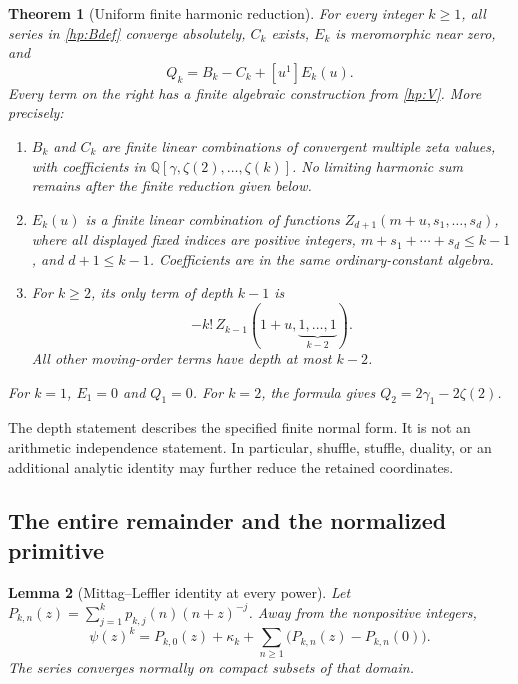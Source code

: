 \documentclass[11pt]{article}
\numberwithin{equation}{section}
\theoremstyle{plain}
\newtheorem{theorem}{Theorem}[section]
\newtheorem{lemma}[theorem]{Lemma}
\theoremstyle{definition}
\theoremstyle{remark}
\newcommand{\Q}{\mathbb Q}
\begin{document}
\begin{theorem}[Uniform finite harmonic reduction]\label{hp:allpowers}
For every integer $k\ge1$, all series in \eqref{hp:Bdef} converge
absolutely, $C_k$ exists, $E_k$ is meromorphic near zero, and
\begin{equation}\label{hp:universal}
 \boxed{\displaystyle Q_k=B_k-C_k+[u^1]E_k(u).}
\end{equation}
Every term on the right has a finite algebraic construction from
\eqref{hp:V}. More precisely:
\begin{enumerate}
 \item $B_k$ and $C_k$ are finite linear combinations of convergent
 multiple zeta values, with coefficients in
 $\Q[\gamma,\zeta(2),\ldots,\zeta(k)]$. No limiting harmonic sum
 remains after the finite reduction given below.
 \item $E_k(u)$ is a finite linear combination of functions
 $Z_{d+1}(m+u,s_1,\ldots,s_d)$, where all displayed fixed indices are
 positive integers, $m+s_1+\cdots+s_d\le k-1$, and $d+1\le k-1$.
 Coefficients are in the same ordinary-constant algebra.
 \item For $k\ge2$, its only term of depth $k-1$ is
 \begin{equation}\label{hp:topdepth}
   -k!\,Z_{k-1}(1+u,\underbrace{1,\ldots,1}_{k-2}).
 \end{equation}
 All other moving-order terms have depth at most $k-2$.
\end{enumerate}
For $k=1$, $E_1=0$ and $Q_1=0$. For $k=2$, the formula gives
$Q_2=2\gamma_1-2\zeta(2)$.
\end{theorem}

The depth statement describes the specified finite normal form.
It is not an arithmetic independence statement. In particular,
shuffle, stuffle, duality, or an additional analytic identity may
further reduce the retained coordinates.

\subsection{The entire remainder and the normalized primitive}

\begin{lemma}[Mittag--Leffler identity at every power]\label{hp:ML}
Let $P_{k,n}(z)=\sum_{j=1}^kp_{k,j}(n)(n+z)^{-j}$. Away from the
nonpositive integers,
\begin{equation}\label{hp:MLformula}
 \psi(z)^k=P_{k,0}(z)+\kappa_k+
                    \sum_{n\ge1}\bigl(P_{k,n}(z)-P_{k,n}(0)\bigr).
\end{equation}
The series converges normally on compact subsets of that domain.
\end{lemma}
\end{document}
